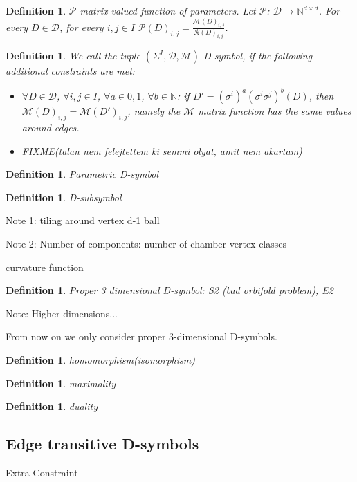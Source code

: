 \documentclass[12pt,a4paper]{article}
\newtheorem{defn}[thm]{Definition}
\begin{document}
\begin{defn}
  \em{$\mathcal{P}$ matrix valued function of parameters.}
  Let $\mathcal{P}$: $\mathcal{D} \rightarrow \mathbb{N}^{d\times d}$.
  For every $D\in\mathcal{D}$, for every $i,j\in I$
  $\mathcal{P}(D)_{i,j}=\frac{\mathcal{M}(D)_{i,j}}{\mathcal{R}(D)_{i,j}}$.
\end{defn}

\begin{defn}
  We call the tuple $(\Sigma^I,\mathcal{D},\mathcal{M})$ \em{D-symbol}, if the
  following additional constraints are met:
  \begin{itemize}
    \item $\forall D\in \mathcal{D}$, $\forall i,j\in I$, $\forall a\in {0,1}$,
      $\forall b\in \mathbb{N}$: if $D'=(\sigma^i)^a(\sigma^i\sigma^j)^b(D)$,
      then $\mathcal{M}(D)_{i,j}=\mathcal{M}(D')_{i,j}$, namely the
      $\mathcal{M}$ matrix function has the same values around edges.
    \item FIXME(talan nem felejtettem ki semmi olyat, amit nem akartam)
  \end{itemize}
\end{defn}

\begin{defn}
  Parametric D-symbol
\end{defn}

\begin{defn}
  D-subsymbol
\end{defn}
Note 1: tiling around vertex d-1 ball

Note 2: Number of components: number of chamber-vertex classes

curvature function

\begin{defn}
  Proper 3 dimensional D-symbol: S2 (bad orbifold problem), E2
\end{defn}
Note: Higher dimensions...

From now on we only consider proper $3$-dimensional D-symbols.

\begin{defn}
  homomorphism(isomorphism)
\end{defn}

\begin{defn}
  maximality
\end{defn}

\begin{defn}
  duality
\end{defn}

\subsection{Edge transitive D-symbols}
Extra Constraint
\end{document}
